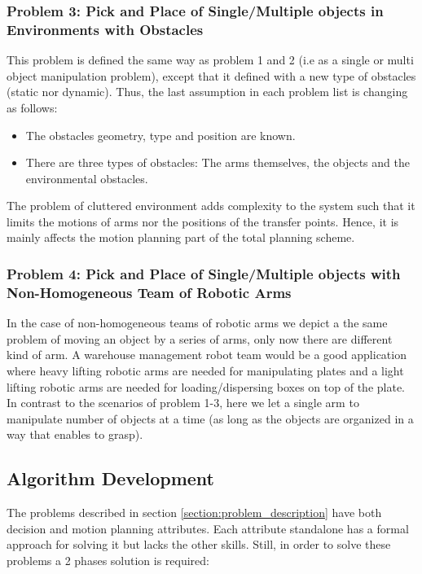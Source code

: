 \subsubsection*{Problem 3: Pick and Place of Single/Multiple objects in Environments with Obstacles}
This problem is defined the same way as problem 1 and 2 (i.e as a single or multi object manipulation problem), except that it defined with a new type of obstacles (static nor dynamic). Thus, the last assumption in each problem list is changing as follows:
\begin{itemize}
\item The obstacles geometry, type and position are known.
\item There are three types of obstacles: The arms themselves, the objects and the environmental obstacles.
\end{itemize} 
The problem of cluttered environment adds complexity to the system such that it limits the motions of arms nor the positions of the transfer points. Hence, it is mainly affects the motion planning part of the total planning scheme. 

\subsubsection*{Problem 4: Pick and Place of Single/Multiple objects with Non-Homogeneous Team of Robotic Arms }
In the case of non-homogeneous teams of robotic arms we depict a the same problem of moving an object by a series of arms, only now there are different kind of arm. A warehouse management robot team would be a good application where heavy lifting robotic arms are needed for manipulating plates and a light lifting robotic arms are needed for loading/dispersing boxes on top of the plate. In contrast to the scenarios of problem 1-3, here we let a single arm to manipulate number of objects at a time (as long as the objects are organized in a way that enables to grasp). 




\subsection{Algorithm Development}
\label{section:algorithm_development}
The problems described in section \ref{section:problem_description} have both decision and motion planning attributes. Each attribute standalone has a formal approach for solving it but lacks the other skills. Still, in order to solve these problems a 2 phases solution is required:

